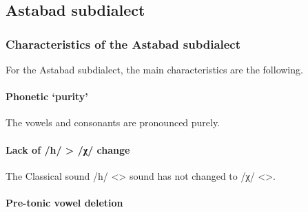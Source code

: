 \begin{table}[H]
	\centering
	\caption{Past participles with /-uk/ <> in the Bayazit subdialect of the Yerevan dialect}
	\label{tab:Yerevan:subdialect:bayazit:uk}
	
\end{table} 

\subsection{Astabad subdialect}

\subsubsection{Characteristics of the Astabad subdialect}
For the Astabad subdialect, the main characteristics are the following.

\paragraph{Phonetic `purity'}

The vowels and consonants are pronounced purely. 

\paragraph{Lack of /h/ > /χ/ change} 

The Classical sound /h/ <> sound has not changed to /χ/ <>. 

\paragraph{Pre-tonic vowel deletion}


